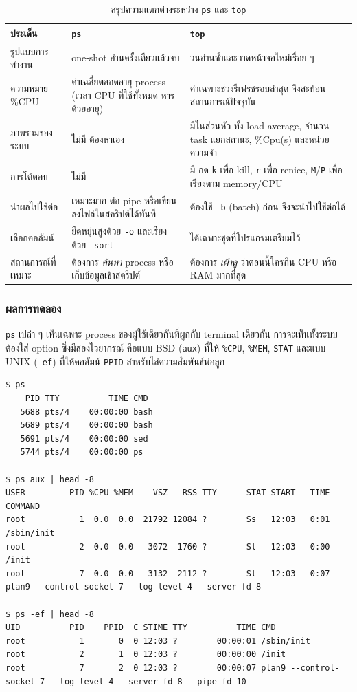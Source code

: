 \documentclass[a4paper,11pt]{article}
\newcommand{\code}[1]{\texttt{#1}}
\begin{document}
\begin{table}[H]
\centering\small
\caption{สรุปความแตกต่างระหว่าง \code{ps} และ \code{top}}
\begin{tabular}{p{2.6cm}p{5.6cm}p{5.6cm}}
\toprule
\textbf{ประเด็น} & \textbf{\code{ps}} & \textbf{\code{top}} \\
\midrule
รูปแบบการทำงาน & one-shot อ่านครั้งเดียวแล้วจบ & วนอ่านซ้ำและวาดหน้าจอใหม่เรื่อย ๆ \\
ความหมาย \%CPU & ค่าเฉลี่ยตลอดอายุ process (เวลา CPU ที่ใช้ทั้งหมด หารด้วยอายุ) & ค่าเฉพาะช่วงรีเฟรชรอบล่าสุด จึงสะท้อนสถานการณ์ปัจจุบัน \\
ภาพรวมของระบบ & ไม่มี ต้องหาเอง & มีในส่วนหัว ทั้ง load average, จำนวน task แยกสถานะ, \%Cpu(s) และหน่วยความจำ \\
การโต้ตอบ & ไม่มี & มี กด \code{k} เพื่อ kill, \code{r} เพื่อ renice, \code{M}/\code{P} เพื่อเรียงตาม memory/CPU \\
นำผลไปใช้ต่อ & เหมาะมาก ต่อ pipe หรือเขียนลงไฟล์ในสคริปต์ได้ทันที & ต้องใช้ \code{-b} (batch) ก่อน จึงจะนำไปใช้ต่อได้ \\
เลือกคอลัมน์ & ยืดหยุ่นสูงด้วย \code{-o} และเรียงด้วย \code{--sort} & ได้เฉพาะชุดที่โปรแกรมเตรียมไว้ \\
สถานการณ์ที่เหมาะ & ต้องการ \emph{ค้นหา} process หรือเก็บข้อมูลเข้าสคริปต์ & ต้องการ \emph{เฝ้าดู} ว่าตอนนี้ใครกิน CPU หรือ RAM มากที่สุด \\
\bottomrule
\end{tabular}
\end{table}

\subsubsection{ผลการทดลอง}

\code{ps} เปล่า ๆ เห็นเฉพาะ process ของผู้ใช้เดียวกันที่ผูกกับ terminal เดียวกัน
การจะเห็นทั้งระบบต้องใส่ option ซึ่งมีสองไวยากรณ์ คือแบบ BSD (\code{aux})
ที่ให้ \code{\%CPU}, \code{\%MEM}, \code{STAT} และแบบ UNIX (\code{-ef})
ที่ให้คอลัมน์ \code{PPID} สำหรับไล่ความสัมพันธ์พ่อลูก

\begin{lstlisting}[style=terminal,caption={\code{ps} เปล่า ๆ เทียบกับ \code{ps aux} และ \code{ps -ef} (ตัดมาบางบรรทัด)}]
$ ps
    PID TTY          TIME CMD
   5688 pts/4    00:00:00 bash
   5689 pts/4    00:00:00 bash
   5691 pts/4    00:00:00 sed
   5744 pts/4    00:00:00 ps

$ ps aux | head -8
USER         PID %CPU %MEM    VSZ   RSS TTY      STAT START   TIME COMMAND
root           1  0.0  0.0  21792 12084 ?        Ss   12:03   0:01 /sbin/init
root           2  0.0  0.0   3072  1760 ?        Sl   12:03   0:00 /init
root           7  0.0  0.0   3132  2112 ?        Sl   12:03   0:07 plan9 --control-socket 7 --log-level 4 --server-fd 8

$ ps -ef | head -8
UID          PID    PPID  C STIME TTY          TIME CMD
root           1       0  0 12:03 ?        00:00:01 /sbin/init
root           2       1  0 12:03 ?        00:00:00 /init
root           7       2  0 12:03 ?        00:00:07 plan9 --control-socket 7 --log-level 4 --server-fd 8 --pipe-fd 10 --
\end{lstlisting}
\end{document}
